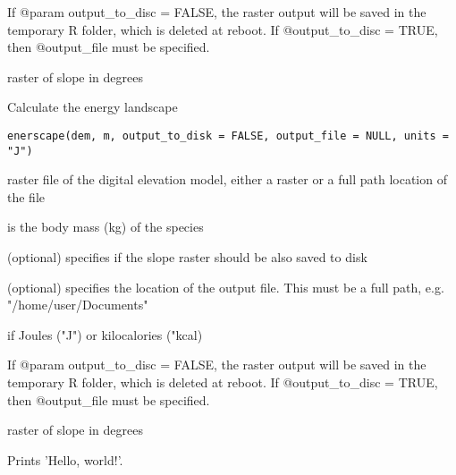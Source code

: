\documentclass[letterpaper]{book}
\begin{document}
%
\begin{Details}\relax
If @param output\_to\_disc = FALSE, the raster output will be saved in
the temporary R folder, which is deleted at reboot. If @output\_to\_disc =
TRUE, then @output\_file must be specified.
\end{Details}
%
\begin{Value}
raster of slope in degrees
\end{Value}
%
\begin{Description}\relax
Calculate the energy landscape
\end{Description}
%
\begin{Usage}
\begin{verbatim}
enerscape(dem, m, output_to_disk = FALSE, output_file = NULL, units = "J")
\end{verbatim}
\end{Usage}
%
\begin{Arguments}
\begin{ldescription}
\item[\code{dem}] raster file of the digital elevation model, either a raster
or a full path location of the file

\item[\code{m}] is the body mass (kg) of the species

\item[\code{output\_to\_disk}] (optional) specifies if the slope raster should be also
saved to disk

\item[\code{output\_file}] (optional) specifies the location of the output file. This
must be a full path, e.g. "/home/user/Documents"

\item[\code{units}] if Joules ("J") or kilocalories ("kcal)
\end{ldescription}
\end{Arguments}
%
\begin{Details}\relax
If @param output\_to\_disc = FALSE, the raster output will be saved in
the temporary R folder, which is deleted at reboot. If @output\_to\_disc =
TRUE, then @output\_file must be specified.
\end{Details}
%
\begin{Value}
raster of slope in degrees
\end{Value}
%
\begin{Description}\relax
Prints 'Hello, world!'.
\end{Description}
\end{document}

